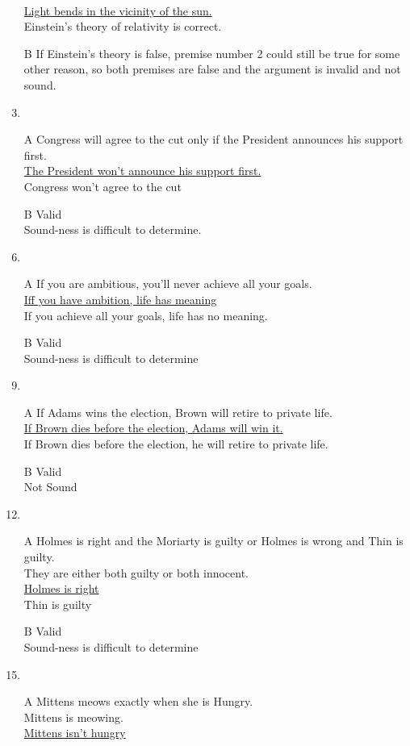\documentclass{article}
\begin{document}
\begin{enumerate}
\\\underline{Light bends in the vicinity of the sun.}
\\Einstein's theory of relativity is correct.
\item[B]
If Einstein's theory is false, premise number 2 could still be true for some other reason, so both premises are false and the argument is invalid and not sound.
\item
\item[A]
Congress will agree to the cut only if the President announces his support first.
\\\underline{The President won't announce his support first.}
\\Congress won't agree to the cut
\item[B]
Valid
\\Sound-ness is difficult to determine.
\item
\item[A]
If you are ambitious, you'll never achieve all your goals.
\\\underline{Iff you have ambition, life has meaning}
\\If you achieve all your goals, life has no meaning.
\item[B]
Valid
\\Sound-ness is difficult to determine
\item
\item[A]
If Adams wins the election, Brown will retire to private life.
\\\underline{If Brown dies before the election, Adams will win it.}
\\If Brown dies before the election, he will retire to private life.
\item[B]
Valid
\\Not Sound
\item
\item[A]
Holmes is right and the Moriarty is guilty or Holmes is wrong and Thin is guilty.
\\They are either both guilty or both innocent.
\\\underline{Holmes is right}
\\Thin is guilty
\item[B]
Valid
\\Sound-ness is difficult to determine
\item
\item[A]
Mittens meows exactly when she is Hungry.
\\Mittens is meowing.
\\\underline{Mittens isn't hungry}

\end{enumerate}
\end{document}
